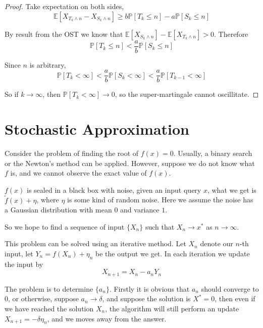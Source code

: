 \begin{proof}
        Take expectation on both sides,
        \[ \mathbb{E}[X_{T_k \wedge n} - X_{S_k \wedge n}] \ge b\mathbb{P}[T_k \le n] - a\mathbb{P}[S_k \le n] \]

        By result from the OST we know that $\mathbb{E}[X_{S_k \wedge n}] - \mathbb{E}[X_{T_k \wedge n}] > 0$. Therefore
        \[ \mathbb{P}[T_k \le n] < \frac{a}{b}\mathbb{P}[S_k \le n] \]

        Since $n$ is arbitrary,
        \[ \mathbb{P}[T_k < \infty] < \frac{a}{b}\mathbb{P}[S_k < \infty] < \frac{a}{b}\mathbb{P}[T_{k-1} < \infty] \]

        So if $k \to \infty$, then $\mathbb{P}[T_k < \infty] \to 0$, so the super-martingale cannot oscillitate.
    \end{proof}


\section{Stochastic Approximation}
    Consider the problem of finding the root of $f(x)=0$. Usually, a binary search or the Newton's method can be applied. However, suppose we do not know what $f$ is, and we cannot observe the exact value of $f(x)$.

    $f(x)$ is sealed in a black box with noise, given an input query $x$, what we get is $\tilde{f}(x) + \eta$, where $\eta$ is some kind of random noise. Here we assume the noise has a Gaussian distribution with mean $0$ and variance $1$.

    So we hope to find a sequence of input $\{X_n\}$ such that $X_n \to x^*$ as $n \to \infty$.

    This problem can be solved using an iterative method. Let $X_n$ denote our $n$-th input, let $Y_n = f(X_n) + \eta_n$ be the output we get. In each iteration we update the input by
    \[ X_{n+1} = X_n - a_nY_n \]

    The problem is to determine $\{a_n\}$. Firstly it is obvious that $a_n$ should converge to $0$, or otherwise, suppose $a_n \to \delta$, and suppose the solution is $X^* = 0$, then even if we have reached the solution $X_n$, the algorithm will still perform an update $X_{n+1} = -\delta \eta_n$, and we moves away from the answer.

